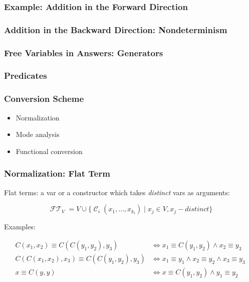 \documentclass[xcolor=table]{beamer}
\DeclareMathOperator{\FlatTerm}{\mathcal{FT}}
\DeclareMathOperator{\Cons}{\mathcal{C}}
\begin{document}
\lstset{basicstyle=\small}

\begin{frame}[fragile]
  \frametitle{Example: Addition in the Forward Direction}



\end{frame}

\begin{frame}[fragile]
  \frametitle{Addition in the Backward Direction: Nondeterminism}



\end{frame}

\begin{frame}[fragile]
  \frametitle{Free Variables in Answers: Generators}



\end{frame}

\begin{frame}[fragile]
  \frametitle{Predicates}
  

  
\end{frame}



\begin{frame}[fragile]
  \frametitle{Conversion Scheme}
  \begin{itemize}
    \item Normalization
    \item Mode analysis
    \item Functional conversion
  \end{itemize}
\end{frame}


\begin{frame}[fragile]
  \frametitle{Normalization: Flat Term}

Flat terms: a var or a constructor which takes \emph{distinct} vars as arguments:

  \[  \FlatTerm_{V} = V \cup \{\Cons_{i}\left( x_1, \ldots, x_{k_{i}} \right) \mid x_{j}\in V, x_j - distinct \} \]

Examples:

\begin{equation*}
\begin{split}
 C\left( x_1, x_2 \right) \equiv C\left( C\left( y_1, y_2 \right), y_3 \right) & \iff x_1 \equiv C\left( y_1, y_2 \right) \land x_2 \equiv y_3 \\
 C\left( C\left( x_1, x_2 \right), x_3 \right) \equiv C\left( C\left( y_1, y_2 \right), y_3 \right) & \iff x_1 \equiv y_1 \land x_2 \equiv y_2 \land x_3 \equiv y_3 \\
 x \equiv C\left( y, y \right) & \iff x \equiv C\left( y_1, y_2 \right)\land y_1 \equiv y_2
\end{split}
\end{equation*}
\end{frame}
\end{document}
